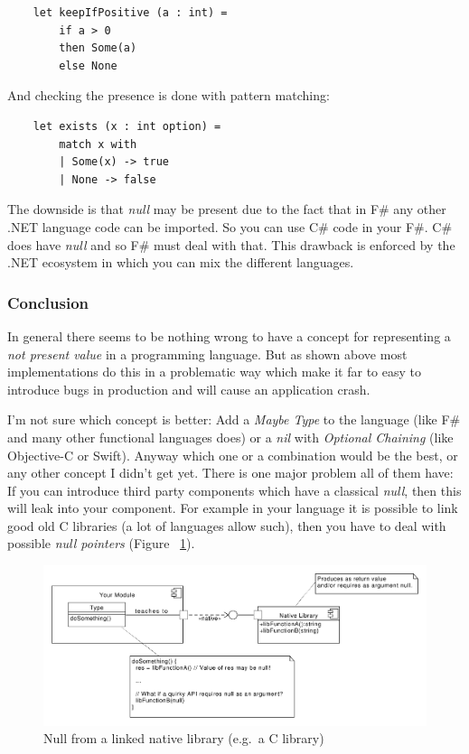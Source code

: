 \documentclass[11pt, a4paper]{report}
\begin{document}
\begin{lstlisting}
    let keepIfPositive (a : int) = 
        if a > 0 
        then Some(a) 
        else None
\end{lstlisting}
 And checking the presence is done with pattern matching:

\begin{lstlisting}
    let exists (x : int option) =
        match x with
        | Some(x) -> true
        | None -> false
\end{lstlisting}
 The downside is that \textit{null} may be present due to the fact that in F\# any other .NET language code can be imported. So you can use C\# code in your F\#. C\# does have \textit{null} and so F\# must deal with that. This drawback is enforced by the .NET ecosystem in which you can mix the different languages.

\subsubsection{Conclusion}

In general there seems to be nothing wrong to have a concept for representing a \textit{not present value} in a programming language. But as shown above most implementations do this in a problematic way which make it far to easy to introduce bugs in production and will cause an application crash.

I'm not sure which concept is better: Add a \textit{Maybe Type} to the language (like F\# and many other functional languages does) or a \textit{nil} with \textit{Optional Chaining} (like Objective-C or Swift). Anyway which one or a combination would be the best, or any other concept I didn't get yet. There is one major problem all of them have: If you can introduce third party components which have a classical \textit{null}, then this will leak into your component. For example in your language it is possible to link good old C libraries (a lot of languages allow such), then you have to deal with possible \textit{null pointers} (Figure ~\ref{fig:Null_from_linked_native_libs}). 

\begin{figure}[ht]
    \centering
    \includegraphics[width=350pt]{grafics/Null_from_linked_native_libs.pdf}
    \caption{Null from a linked native library (e.g.\ a C library)}
    \label{fig:Null_from_linked_native_libs}
\end{figure}
\end{document}
